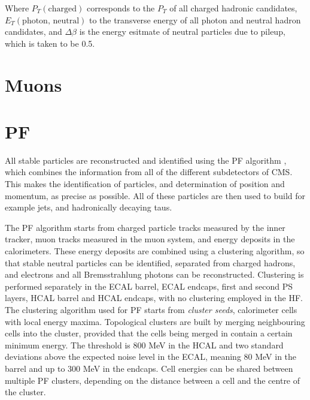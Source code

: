 Where $P_{T}(\text{charged})$ corresponds to the $P_{T}$ of all charged hadronic candidates,
$E_{T}(\text{photon, neutral})$ to the transverse energy of all photon and neutral hadron candidates, and $\Delta \beta$ is the energy
esitmate of neutral particles due to pileup, which is taken to be 0.5.


\section{Muons}
\label{sec:objects_muo}

\section{\acl{PF}}
\label{sec:objects_pf}
All stable particles are reconstructed and identified using the \ac{PF} algorithm \cite{cms-pf-2009,cms-pf-2010-commfirst,cms-pf-2010-2}, which
combines the information from all of the different subdetectors of \ac{CMS}. This makes
the identification of particles, and determination of position and momentum, as precise
as possible. All of these particles are then used to build for example jets, \MET and hadronically
decaying taus.

The \ac{PF} algorithm starts from charged particle tracks measured
by the inner tracker, muon tracks measured in the muon system, and 
energy deposits in the calorimeters. These energy deposits are combined
using a clustering algorithm, so that stable neutral particles can be identified,
separated from charged hadrons, and electrons and all Bremsstrahlung photons
can be reconstructed. Clustering is performed separately in the \ac{ECAL} barrel,
\ac{ECAL} endcaps, first and second \ac{PS} layers, \ac{HCAL} barrel and \ac{HCAL} endcaps, with no 
clustering employed in the \ac{HF}.
The clustering algorithm used for \ac{PF} starts from \textit{cluster seeds},
calorimeter cells with local energy maxima. Topological clusters are built by 
merging neighbouring cells into the cluster, provided that the cells
being merged in contain a certain minimum energy.
The threshold is 800 MeV in the \ac{HCAL} and two standard deviations above the
expected noise level in the \ac{ECAL}, meaning 80 MeV in the barrel and up 
to 300 MeV in the endcaps. Cell energies can be shared between multiple
\ac{PF} clusters, depending on the distance between a cell and the centre of the cluster.

